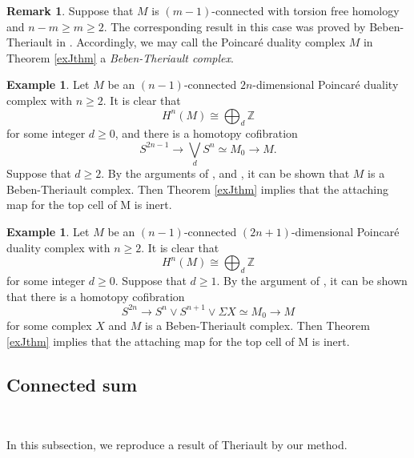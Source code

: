 \documentclass[a4]{amsart}
\theoremstyle{definition}
\newtheorem{remark}[theorem]{Remark}
\newtheorem{example}[theorem]{Example}
\begin{document}
\begin{sloppypar}
\begin{remark}\label{BT14rmk}
Suppose that $M$ is $(m-1)$-connected with torsion free homology and $n-m\geq m\geq 2$. The corresponding result in this case was proved by Beben-Theriault in \cite{BT14}. Accordingly, we may call the Poincar\'{e} duality complex $M$ in Theorem \ref{exJthm} a {\it Beben-Theriault complex}. 
\end{remark}


\begin{example}\label{BTex1}
Let $M$ be an $(n-1)$-connected $2n$-dimensional Poincar\'{e} duality complex with $n\geq 2$. It is clear that 
\[
H^n(M)\cong \bigoplus_{d}\mathbb{Z}
\]
for some integer $d\geq 0$, and there is a homotopy cofibration
\[
S^{2n-1}\stackrel{}{\longrightarrow} \bigvee_{d} S^n\simeq M_0\stackrel{}{\longrightarrow} M.
\]
Suppose that $d\geq 2$. By the arguments of \cite[Example 4.2]{BT22}, \cite[Lemma 3.1]{Hua22} and \cite[Lemma 3.2]{Hua24}, it can be shown that $M$ is a Beben-Theriault complex. Then Theorem \ref{exJthm} implies that the attaching map for the top cell of M is inert.
\end{example}

\begin{example}\label{BTex2}
Let $M$ be an $(n-1)$-connected $(2n+1)$-dimensional Poincar\'{e} duality complex with $n\geq 2$. It is clear that 
\[
H^n(M)\cong \bigoplus_{d}\mathbb{Z}
\]
for some integer $d\geq 0$. Suppose that $d\geq 1$. By the argument of \cite[Example 4.4]{BT22}, it can be shown that there is a homotopy cofibration
\[
S^{2n}\stackrel{}{\longrightarrow}  S^n\vee S^{n+1}\vee \Sigma X\simeq M_0\stackrel{}{\longrightarrow} M
\]
for some complex $X$ and $M$ is a Beben-Theriault complex. Then Theorem \ref{exJthm} implies that the attaching map for the top cell of M is inert.
\end{example}
\subsection{Connected sum}
\label{subsec: sum}

$\, $


In this subsection, we reproduce a result of Theriault \cite{The24a} by our method.


\end{sloppypar}
\end{document}
